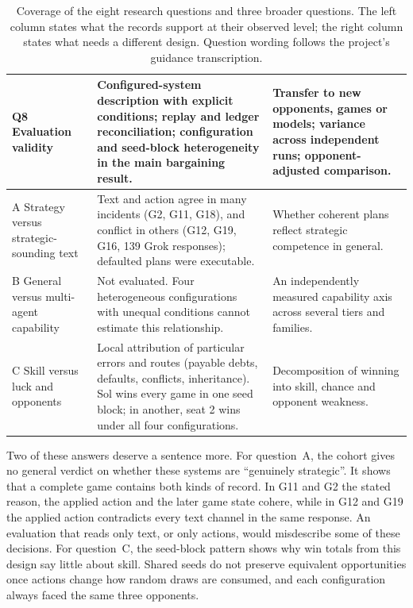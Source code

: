 \begin{table}[p]
\begin{tabularx}{\linewidth}{@{}L{2.6cm}YY@{}}
Q8 Evaluation validity & Configured-system description with explicit conditions; replay and ledger reconciliation; configuration and seed-block heterogeneity in the main bargaining result. & Transfer to new opponents, games or models; variance across independent runs; opponent-adjusted comparison.\\
\midrule
A Strategy versus strategic-sounding text & Text and action agree in many incidents (G2, G11, G18), and conflict in others (G12, G19, G16, 139 Grok responses); defaulted plans were executable. & Whether coherent plans reflect strategic competence in general.\\
B General versus multi-agent capability & Not evaluated. Four heterogeneous configurations with unequal conditions cannot estimate this relationship. & An independently measured capability axis across several tiers and families.\\
C Skill versus luck and opponents & Local attribution of particular errors and routes (payable debts, defaults, conflicts, inheritance). Sol wins every game in one seed block; in another, seat 2 wins under all four configurations. & Decomposition of winning into skill, chance and opponent weakness.\\
\bottomrule
\end{tabularx}
\caption{Coverage of the eight research questions and three broader questions. The left column states what the records support at their observed level; the right column states what needs a different design. Question wording follows the project's guidance transcription.}
\label{tab:questions}
\end{table}

Two of these answers deserve a sentence more. For question~A, the cohort gives no general verdict on whether these systems are ``genuinely strategic''. It shows that a complete game contains both kinds of record. In G11 and G2 the stated reason, the applied action and the later game state cohere, while in G12 and G19 the applied action contradicts every text channel in the same response. An evaluation that reads only text, or only actions, would misdescribe some of these decisions. For question~C, the seed-block pattern shows why win totals from this design say little about skill. Shared seeds do not preserve equivalent opportunities once actions change how random draws are consumed, and each configuration always faced the same three opponents.
\FloatBarrier
